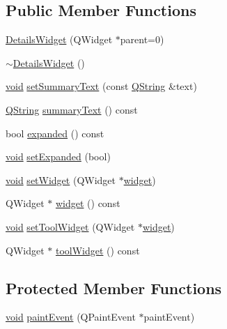 \subsection*{Public Member Functions}
\begin{DoxyCompactItemize}
\item 
\hyperlink{class_utils_1_1_details_widget_aa0ae292ed3fc5a82ee55fffb79eaa6ff}{Details\-Widget} (Q\-Widget $\ast$parent=0)
\item 
\hyperlink{class_utils_1_1_details_widget_a9a875b874501f81639c8401f9cf9057e}{$\sim$\-Details\-Widget} ()
\item 
\hyperlink{group___u_a_v_objects_plugin_ga444cf2ff3f0ecbe028adce838d373f5c}{void} \hyperlink{class_utils_1_1_details_widget_a1aa501fbf4e176597700a73aa5f8cd11}{set\-Summary\-Text} (const \hyperlink{group___u_a_v_objects_plugin_gab9d252f49c333c94a72f97ce3105a32d}{Q\-String} \&text)
\item 
\hyperlink{group___u_a_v_objects_plugin_gab9d252f49c333c94a72f97ce3105a32d}{Q\-String} \hyperlink{class_utils_1_1_details_widget_a239341cec0b796a1f5b57addfea8425d}{summary\-Text} () const 
\item 
bool \hyperlink{class_utils_1_1_details_widget_a128f49aacab86017c0b856ce7178d0c9}{expanded} () const 
\item 
\hyperlink{group___u_a_v_objects_plugin_ga444cf2ff3f0ecbe028adce838d373f5c}{void} \hyperlink{class_utils_1_1_details_widget_a71bb50697df68e40ea56ee57f6277e13}{set\-Expanded} (bool)
\item 
\hyperlink{group___u_a_v_objects_plugin_ga444cf2ff3f0ecbe028adce838d373f5c}{void} \hyperlink{class_utils_1_1_details_widget_ae744ea85a5de470f73f5185addcb5faa}{set\-Widget} (Q\-Widget $\ast$\hyperlink{class_utils_1_1_details_widget_a9950386de7995df703fd0b1059838579}{widget})
\item 
Q\-Widget $\ast$ \hyperlink{class_utils_1_1_details_widget_a9950386de7995df703fd0b1059838579}{widget} () const 
\item 
\hyperlink{group___u_a_v_objects_plugin_ga444cf2ff3f0ecbe028adce838d373f5c}{void} \hyperlink{class_utils_1_1_details_widget_a9294d5fbf7dafdf46c0af597b5643b36}{set\-Tool\-Widget} (Q\-Widget $\ast$\hyperlink{class_utils_1_1_details_widget_a9950386de7995df703fd0b1059838579}{widget})
\item 
Q\-Widget $\ast$ \hyperlink{class_utils_1_1_details_widget_a4e95bb9f73ff8f16bd89f34eeb5197ab}{tool\-Widget} () const 
\end{DoxyCompactItemize}
\subsection*{Protected Member Functions}
\begin{DoxyCompactItemize}
\item 
\hyperlink{group___u_a_v_objects_plugin_ga444cf2ff3f0ecbe028adce838d373f5c}{void} \hyperlink{class_utils_1_1_details_widget_a4af97bad7f016f8b57a768d6ab2bcc43}{paint\-Event} (Q\-Paint\-Event $\ast$paint\-Event)
\end{DoxyCompactItemize}
